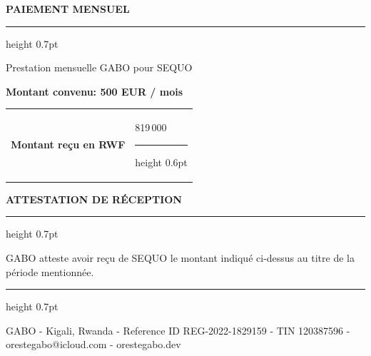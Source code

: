 \documentclass[11pt,a4paper]{article}
\makeatletter
\newcommand{\montantRwf}{819\,000}
\newcommand{\sectionTitle}[1]{%
  \vspace{0.85cm}
  {\large\bfseries\color{GaboOlive}#1}\par
  \vspace{0.12cm}
  {\color{GaboLine}\hrule height 0.7pt}
  \vspace{0.55cm}
}
\newcommand{\fieldValue}[2]{%
  \begin{tabularx}{\linewidth}{@{}p{3.6cm}X@{}}
    {\color{GaboMuted}\bfseries #1} &
    {\color{GaboInk}#2}\par
    {\color{GaboLine}\hrule height 0.6pt}
  \end{tabularx}
}
\makeatother
\begin{document}
\sectionTitle{PAIEMENT MENSUEL}
\noindent
Prestation mensuelle GABO pour SEQUO\par
\vspace{0.38cm}
\noindent
\begin{minipage}[t]{0.45\textwidth}
  {\large\bfseries\color{GaboGreen}Montant convenu: 500 EUR / mois}
\end{minipage}
\hfill
\begin{minipage}[t]{0.48\textwidth}
  \fieldValue{Montant re\c{c}u en RWF}{\montantRwf}
\end{minipage}

\sectionTitle{ATTESTATION DE R\'ECEPTION}
\noindent
{\large GABO atteste avoir re\c{c}u de SEQUO le montant indiqu\'e ci-dessus au titre de la p\'eriode mentionn\'ee.}

\vfill
{\color{GaboLine}\hrule height 0.7pt}
\vspace{0.25cm}
{\small\color{GaboMuted}GABO - Kigali, Rwanda - Reference ID REG-2022-1829159 - TIN 120387596 - orestegabo@icloud.com - orestegabo.dev}
\end{document}
